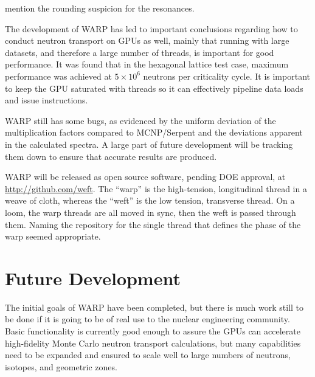 \documentclass[preprint,12pt]{elsarticle}
\begin{document}
mention the rounding suspicion for the resonances.

The development of WARP has led to important conclusions regarding how to conduct neutron transport on GPUs as well, mainly that running with large datasets, and therefore a large number of threads, is important for good performance.  It was found that in the hexagonal lattice test case, maximum performance was achieved at $5\times10^6$ neutrons per criticality cycle.  It is important to keep the GPU saturated with threads so it can effectively pipeline data loads and issue instructions.  

WARP still has some bugs, as evidenced by the uniform deviation of the multiplication factors compared to MCNP/Serpent and the deviations apparent in the calculated spectra.  A large part of future development will be tracking them down to ensure that accurate results are produced.

WARP will be released as open source software, pending DOE approval, at \url{http://github.com/weft}. The ``warp'' is the high-tension, longitudinal thread in a weave of cloth, whereas the ``weft'' is the low tension, transverse thread.  On a loom, the warp threads are all moved in sync, then the weft is passed through them.  Naming the repository for the single thread that defines the phase of the warp seemed appropriate.

\section{Future Development}
\label{sec:dev}

The initial goals of WARP have been completed, but there is much work still to be done if it is going to be of real use to the nuclear engineering community.  Basic functionality is currently good enough to assure the GPUs can accelerate high-fidelity Monte Carlo neutron transport calculations, but many capabilities need to be expanded and ensured to scale well to large numbers of neutrons, isotopes, and geometric zones.  
\end{document}
